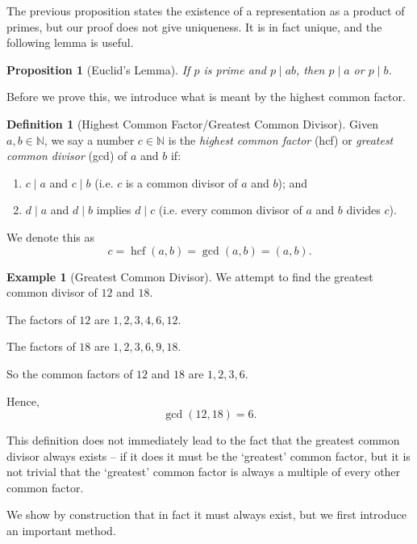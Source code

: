 \documentclass{article}
\newtheorem{proposition}[theorem]{Proposition}
\theoremstyle{definition}
\newtheorem{definition}[theorem]{Definition}
\newtheorem{example}[theorem]{Example}
\theoremstyle{remark}
\newcommand{\pqty}[1]{\left(#1\right)}
\newcommand{\divides}{\mid}
\newcommand{\hcf}{\operatorname{hcf}}
\newcommand{\NN}{\mathbb{N}}
\begin{document}
The previous proposition states the existence of a representation as a product of primes, but our proof does not give uniqueness. It is in fact unique, and the following lemma is useful.

\begin{proposition}[Euclid's Lemma]
    If \(p\) is prime and \(p \divides ab\), then \(p \divides a\) or \(p \divides b\).
\end{proposition}

Before we prove this, we introduce what is meant by the highest common factor.

\begin{definition}[Highest Common Factor/Greatest Common Divisor]
    Given \(a, b \in \NN\), we say a number \(c \in \NN\) is the \emph{highest common factor} (hcf) or \emph{greatest common divisor} (gcd) of \(a\) and \(b\) if:
    \begin{enumerate}
        \item \(c \divides a\) and \(c \divides b\) (i.e. \(c\) is a common divisor of \(a\) and \(b\)); and
        \item \(d \divides a\) and \(d \divides b\) implies \(d \divides c\) (i.e. every common divisor of \(a\) and \(b\) divides \(c\)).
    \end{enumerate}

    We denote this as
    \[
        c = \hcf\pqty{a, b} = \gcd\pqty{a, b} = \pqty{a, b}.
    \]
\end{definition}

\begin{example}[Greatest Common Divisor]
    We attempt to find the greatest common divisor of \(12\) and \(18\).

    The factors of \(12\) are \(1, 2, 3, 4, 6, 12\).

    The factors of \(18\) are \(1, 2, 3, 6, 9, 18\).

    So the common factors of \(12\) and \(18\) are \(1, 2, 3, 6\).

    Hence,
    \[
        \gcd\pqty{12, 18} = 6.
    \]
\end{example}

This definition does not immediately lead to the fact that the greatest common divisor always exists -- if it does it must be the `greatest' common factor, but it is not trivial that the `greatest' common factor is always a multiple of every other common factor.

We show by construction that in fact it must always exist, but we first introduce an important method.
\end{document}
